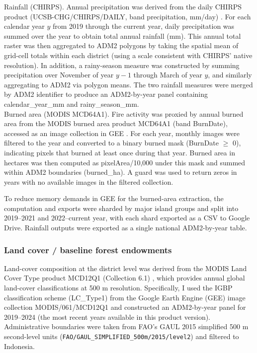 \documentclass[hidelinks,12pt]{article}
\begin{document}
Rainfall (CHIRPS). Annual precipitation was derived from the daily CHIRPS product (UCSB-CHG/CHIRPS/DAILY, band precipitation, mm/day) \citep{chc_nd_chirps_daily_v2_gee}. For each calendar year $y$ from 2019 through the current year, daily precipitation was summed over the year to obtain total annual rainfall (mm). This annual total raster was then aggregated to ADM2 polygons by taking the spatial mean of grid-cell totals within each district (using a scale consistent with CHIRPS’ native resolution). In addition, a rainy-season measure was constructed by summing precipitation over November of year $y-1$ through March of year $y$, and similarly aggregating to ADM2 via polygon means. The two rainfall measures were merged by ADM2 identifier to produce an ADM2-by-year panel containing calendar\_year\_mm and rainy\_season\_mm.\\

Burned area (MODIS MCD64A1). Fire activity was proxied by annual burned area from the MODIS burned area product MCD64A1 (band BurnDate), accessed as an image collection in GEE \citep{nasa_lpdaac_nd_mcd64a1_061_gee}. For each year, monthly images were filtered to the year and converted to a binary burned mask (BurnDate $\ge$ 0), indicating pixels that burned at least once during that year. Burned area in hectares was then computed as pixelArea/10,000 under this mask and summed within ADM2 boundaries (burned\_ha). A guard was used to return zeros in years with no available images in the filtered collection.

To reduce memory demands in GEE for the burned-area extraction, the computation and exports were sharded by major island groups and split into 2019–2021 and 2022–current year, with each shard exported as a CSV to Google Drive. Rainfall outputs were exported as a single national ADM2-by-year table.






\subsubsection{Land cover / baseline forest endowments}
Land-cover composition at the district level was derived from the MODIS Land Cover Type product MCD12Q1 (Collection 6.1) \citep{nasa_lpdaac_nd_mcd12q1_061_gee}, which provides annual global land-cover classifications at 500 m resolution. Specifically, I used the IGBP classification scheme (LC\_Type1) from the Google Earth Engine (GEE) image collection MODIS/061/MCD12Q1 and constructed an ADM2-by-year panel for 2019–2024 (the most recent years available in this product version). Administrative boundaries were taken from FAO’s GAUL 2015 simplified 500 m second-level units (\nolinkurl{FAO/GAUL\_SIMPLIFIED\_500m/2015/level2}) and filtered to Indonesia.
\end{document}
